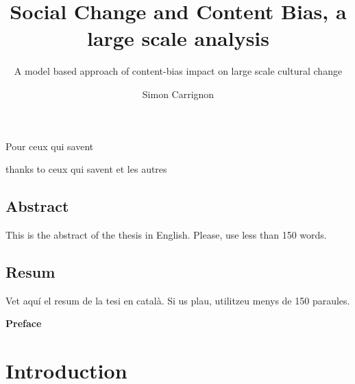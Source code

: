 \documentclass[12pt, b5paper,twoside]{tesi_upf}
\title{Social Change and Content Bias, a large scale analysis}
\subtitle{A model based approach of content-bias impact on large scale cultural change}
\author{Simon Carrignon}
\begin{document}
\frontmatter

\maketitle

\cleardoublepage



\noindent Pour ceux qui savent

\cleardoublepage



 thanks to ceux qui savent et les autres

\cleardoublepage


\section*{\Large \sffamily Abstract}
This is the abstract of the thesis in English.  Please, use less
than 150 words.

\vspace*{\fill}
\section*{\Large \sffamily  Resum}
Vet aquí el resum de la tesi en català.  Si us plau, utilitzeu
menys de 150 paraules.
\vspace*{\fill}

\cleardoublepage

{\bf Preface}

\cleardoublepage


\tableofcontents

\listoffigures

\listoftables

\mainmatter


\chapter{ Introduction}
\end{document}
